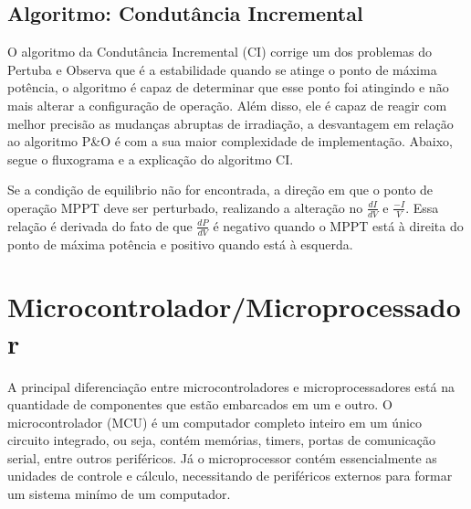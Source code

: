\subsection{Algoritmo: Condutância Incremental}

O algoritmo da Condutância Incremental (CI) corrige um dos problemas do Pertuba e Observa que é a estabilidade quando se atinge o ponto de máxima potência, o algoritmo é capaz de determinar que esse ponto foi atingindo e não mais alterar a configuração de operação. Além disso, ele é capaz de reagir com melhor precisão as mudanças abruptas de irradiação, a desvantagem em relação ao algoritmo P\&O é com a sua maior complexidade de implementação. Abaixo, segue o fluxograma e a explicação do algoritmo CI.

\noindent
\begin{minipage}{\linewidth}
\label{CI_flux_fig}
\end{minipage}

Se a condição de equilibrio não for encontrada, a direção em que o ponto de operação MPPT deve ser perturbado, realizando a alteração no $\frac{dI}{dV}$ e $\frac{-I}{V}$. Essa relação é derivada do fato de que $\frac{dP}{dV}$ é negativo quando o MPPT está à direita do ponto de máxima potência e positivo quando está à esquerda.

\section{Microcontrolador/Microprocessador}\label{mcu_revision}
A principal diferenciação entre microcontroladores e microprocessadores está na quantidade de componentes que estão embarcados em um e outro. O microcontrolador (MCU) é um computador completo inteiro em um único circuito integrado, ou seja, contém memórias, timers, portas de comunicação serial, entre outros periféricos. Já o microprocessor contém essencialmente as unidades de controle e cálculo, necessitando de periféricos externos para formar um sistema minímo de um computador.

